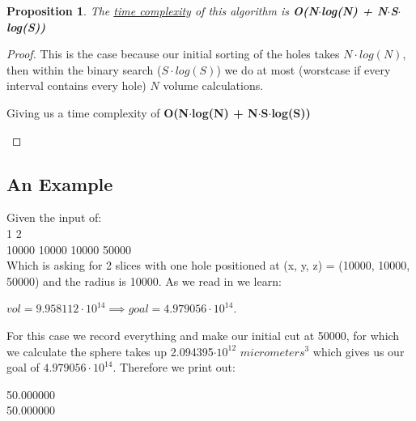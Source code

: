 \documentclass[12pt]{article}
\newtheorem{proposition}[theorem]{Proposition}
\begin{document}
\begin{proposition}
\label{numq}
The \underline{time complexity} of this algorithm is \textbf{O(N$\cdot$log(N) + N$\cdot$S$\cdot$log(S))}
\end{proposition}

\begin{proof}
This is the case because our initial sorting of the holes takes $N\cdot log(N)$, then within the binary
search ($S\cdot log(S)$) we do at most (worstcase if every interval contains every hole) $N$ volume
calculations.
\begin{center}
    Giving us a time complexity of \textbf{O(N$\cdot$log(N) + N$\cdot$S$\cdot$log(S))}
\end{center}
\end{proof}


\subsection{An Example}
Given the input of:  \\
1 2                         \\
10000 10000 10000 50000     \\

Which is asking for 2 slices with one hole positioned at (x, y, z) = (10000, 10000, 50000) and the
radius is 10000. As we read in we learn:
\begin{center}$vol = 9.958112\cdot10^{14} \implies goal = 4.979056\cdot10^{14}$.\end{center}
For this case we record everything and make our initial cut at 50000, for which we calculate the sphere
takes up 2.094395$\cdot10^{12}$ $micrometers^3$ which gives us our goal of $4.979056\cdot10^{14}$. Therefore
we print out:
\begin{center}50.000000 \\
50.000000\end{center}

\newpage














\end{document}
